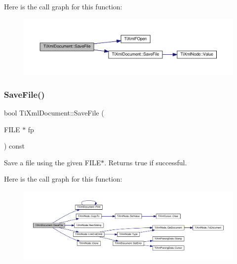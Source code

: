 Here is the call graph for this function\+:
\nopagebreak
\begin{figure}[H]
\begin{center}
\leavevmode
\includegraphics[width=350pt]{class_ti_xml_document_ae641f33784381017c44e107cc2c86b5c_cgraph}
\end{center}
\end{figure}
\mbox{\label{class_ti_xml_document_a8f5a1022168a5767e32becec7b6f44ee}} 
\subsubsection{\texorpdfstring{Save\+File()}{SaveFile()}\hspace{0.1cm}{\footnotesize\ttfamily [3/3]}}
{\footnotesize\ttfamily bool Ti\+Xml\+Document\+::\+Save\+File (\begin{DoxyParamCaption}\item[{F\+I\+LE $\ast$}]{fp }\end{DoxyParamCaption}) const}



Save a file using the given F\+I\+L\+E$\ast$. Returns true if successful. 

Here is the call graph for this function\+:
\nopagebreak
\begin{figure}[H]
\begin{center}
\leavevmode
\includegraphics[width=350pt]{class_ti_xml_document_a8f5a1022168a5767e32becec7b6f44ee_cgraph}
\end{center}
\end{figure}
\mbox{\label{class_ti_xml_document_a735c23e318597b920c94eae77fa206de}} 
